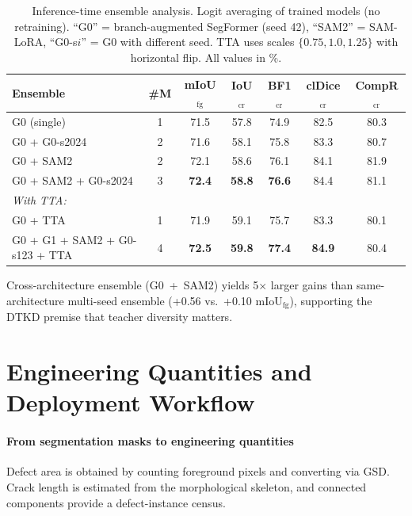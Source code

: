 \documentclass[review,authoryear]{elsarticle}
\begin{document}
\begin{table}[t]
\centering
\caption{Inference-time ensemble analysis. Logit averaging of trained models (no retraining). ``G0'' = branch-augmented SegFormer (seed 42), ``SAM2'' = SAM-LoRA, ``G0-s$i$'' = G0 with different seed. TTA uses scales $\{0.75, 1.0, 1.25\}$ with horizontal flip. All values in \%.}
\label{tab:supp_ensemble}
\begin{tabular}{lcccccc}
\toprule
Ensemble & \#M & mIoU$_{\text{fg}}$ & IoU$_{\text{cr}}$ & BF1$_{\text{cr}}$ & clDice$_{\text{cr}}$ & CompR$_{\text{cr}}$ \\
\midrule
G0 (single) & 1 & 71.5 & 57.8 & 74.9 & 82.5 & 80.3 \\
G0 + G0-s2024 & 2 & 71.6 & 58.1 & 75.8 & 83.3 & 80.7 \\
G0 + SAM2 & 2 & 72.1 & 58.6 & 76.1 & 84.1 & 81.9 \\
G0 + SAM2 + G0-s2024 & 3 & \textbf{72.4} & \textbf{58.8} & \textbf{76.6} & 84.4 & 81.1 \\
\midrule
\multicolumn{7}{l}{\emph{With TTA:}} \\
G0 + TTA & 1 & 71.9 & 59.1 & 75.7 & 83.3 & 80.1 \\
G0 + G1 + SAM2 + G0-s123 + TTA & 4 & \textbf{72.5} & \textbf{59.8} & \textbf{77.4} & \textbf{84.9} & 80.4 \\
\bottomrule
\end{tabular}
\end{table}

Cross-architecture ensemble (G0~+~SAM2) yields 5$\times$ larger gains than same-architecture multi-seed ensemble (+0.56 vs.\ +0.10 mIoU$_{\text{fg}}$), supporting the DTKD premise that teacher diversity matters.

\section{Engineering Quantities and Deployment Workflow}
\label{sec:supp_engineering}

\paragraph{From segmentation masks to engineering quantities}
Defect area is obtained by counting foreground pixels and converting via GSD. Crack length is estimated from the morphological skeleton, and connected components provide a defect-instance census.
\end{document}
